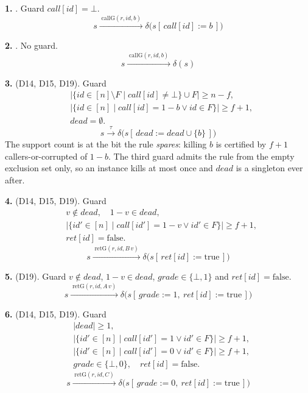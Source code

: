 \medskip
\noindent\textbf{1.} .
Guard $call[id] = \bot$.
\[ s \xrightarrow{\;\mathrm{callG}(r,id,b)\;} \delta\bigl(s[\,call[id] := b\,]\bigr) \]

\noindent\textbf{2.} .
No guard.
\[ s \xrightarrow{\;\mathrm{callG}(r,id,b)\;} \delta(s) \]

\noindent\textbf{3.}  (D14, D15, D19).
Guard
\[ \begin{aligned}
     &\bigl|\{id \in [n]\setminus F \mid call[id] \neq \bot\} \cup F\bigr| \ge n - f,\\
     &\bigl|\{id \in [n] \mid call[id] = 1-b \vee id \in F\}\bigr| \ge f + 1,\\
     &dead = \emptyset.
   \end{aligned} \]
\[ s \xrightarrow{\;\tau\;} \delta\bigl(s[\,dead := dead \cup \{b\}\,]\bigr) \]
\noindent The support count is at the bit the rule \emph{spares}: killing $b$ is certified by $f{+}1$ callers-or-corrupted of $1-b$.
The third guard admits the rule from the empty exclusion set only, so an instance kills at most once and $dead$ is a singleton ever after.

\noindent\textbf{4.}  (D14, D15, D19).
Guard
\[ \begin{aligned}
     &v \notin dead,\quad 1-v \in dead,\\
     &\bigl|\{id' \in [n] \mid call[id'] = 1-v \vee id' \in F\}\bigr| \ge f + 1,\\
     &ret[id] = \mathrm{false}.
   \end{aligned} \]
\[ s \xrightarrow{\;\mathrm{retG}(r,id,B\,v)\;}
   \delta\bigl(s[\,ret[id] := \mathrm{true}\,]\bigr) \]

\noindent\textbf{5.}  (D19).
Guard $v \notin dead$, $1-v \in dead$, $grade \in \{\bot, 1\}$ and $ret[id] = \mathrm{false}$.
\[ s \xrightarrow{\;\mathrm{retG}(r,id,A\,v)\;}
   \delta\bigl(s[\,grade := 1,\ ret[id] := \mathrm{true}\,]\bigr) \]

\noindent\textbf{6.}  (D14, D15, D19).
Guard
\[ \begin{aligned}
     &|dead| \ge 1,\\
     &\bigl|\{id' \in [n] \mid call[id'] = 1 \vee id' \in F\}\bigr| \ge f + 1,\\
     &\bigl|\{id' \in [n] \mid call[id'] = 0 \vee id' \in F\}\bigr| \ge f + 1,\\
     &grade \in \{\bot, 0\},\quad ret[id] = \mathrm{false}.
   \end{aligned} \]
\[ s \xrightarrow{\;\mathrm{retG}(r,id,C)\;}
   \delta\bigl(s[\,grade := 0,\ ret[id] := \mathrm{true}\,]\bigr) \]

